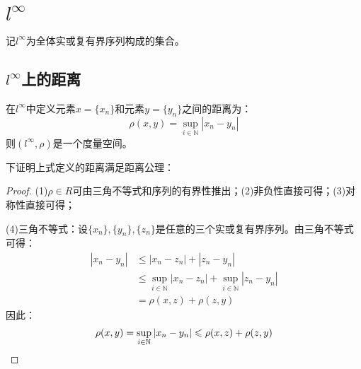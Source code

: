\section{$l^\infty$}

记$l^\infty$为全体实或复有界序列构成的集合。

\subsection{$l^\infty$上的距离}
\begin{definition}
	在$l^\infty$中定义元素$x=\{x_n\}$和元素$y=\{y_n\}$之间的距离为：
	\begin{equation*}
		\rho(x,y)=\sup_{i\in\mathbb{N}}|x_n-y_n|
	\end{equation*}
	则$(l^\infty,\rho)$是一个度量空间。
\end{definition}
下证明上式定义的距离满足距离公理：
\begin{proof}
	(1)$\rho\in R$可由三角不等式和序列的有界性推出；(2)非负性直接可得；(3)对称性直接可得；\par
	(4)三角不等式：设$\{x_n\},\{y_n\},\{z_n\}$是任意的三个实或复有界序列。由三角不等式可得：
	\begin{align*}
		|x_n-y_n|&\leqslant|x_n-z_n|+|z_n-y_n| \\
		&\leqslant\sup_{i\in\mathbb{N}}|x_n-z_n|+\sup_{i\in\mathbb{N}}|z_n-y_n| \\
		&=\rho(x,z)+\rho(z,y)
	\end{align*}
	因此：
	\begin{equation*}
		\rho(x,y)=\sup_{i\in\mathbb{N}}|x_n-y_n|\leqslant\rho(x,z)+\rho(z,y)\qedhere
	\end{equation*}
\end{proof}